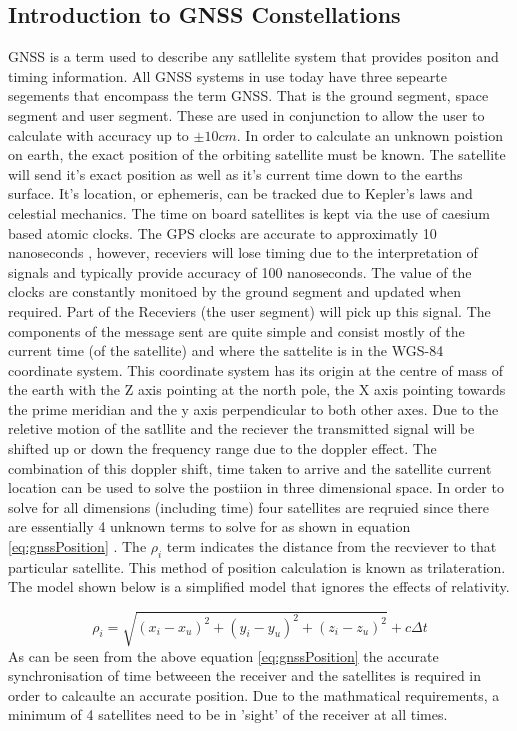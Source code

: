 \subsection{Introduction to GNSS Constellations}\label{subsec:GNSS_Intro}
GNSS is a term used to describe any satllelite system that provides positon and timing information. All GNSS systems in use today have three sepearte segements that
encompass the term GNSS. That is the ground segment, space segment and user segment. These are used in conjunction to allow the user to calculate with accuracy up to $\pm
10cm$. In order to calculate an unknown poistion on earth, the exact position of the orbiting satellite must be known. The satellite will send it's exact position as well
as it's current time down to the earths surface. It's location, or ephemeris, can be tracked due to Kepler's laws and celestial mechanics. The time on board satellites is
kept via the use of caesium based atomic clocks. The GPS clocks are accurate to approximatly 10 nanoseconds , however, receviers will lose timing due to
the interpretation of signals and typically provide accuracy of 100 nanoseconds. The value of the clocks are constantly monitoed by the ground segment and updated when
required. Part of the Receviers (the user segment) will pick up this signal. The components of the message sent are quite simple and consist
mostly of the current time (of the satellite) and where the sattelite is in the WGS-84 coordinate system\cite{RN46}. This coordinate system has its origin at the centre of mass of
the earth with the Z axis pointing at the north pole, the X axis pointing towards the prime meridian and the y axis perpendicular to both other axes. Due to the reletive
motion of the satllite and the reciever the transmitted signal will be shifted up or down the frequency range due to the doppler effect. The combination of this doppler
shift, time taken to arrive and the satellite current location can be used to solve the postiion in three dimensional space. In order to solve for all dimensions
(including time) four satellites are reqruied since there are essentially 4 unknown terms to solve for as shown in equation \ref{eq:gnssPosition} \cite{RN46}. The
$\rho_i$ term indicates the distance from the recviever to that particular satellite. This method of position calculation is known as trilateration. The model shown below
is a simplified model that ignores the effects of relativity. 

\begin{equation} \label{eq:gnssPosition} 
    \rho_i = \sqrt{(x_i - x_u)^2 + (y_i - y_u)^2 + (z_i - z_u)^2} + c \Delta t
\end{equation}
As can be seen from the above equation \ref{eq:gnssPosition} the accurate synchronisation of time betweeen the receiver and the satellites is required in order to
calcaulte an accurate position. Due to the mathmatical requirements, a minimum of 4 satellites need to be in 'sight' of the receiver at all times.

